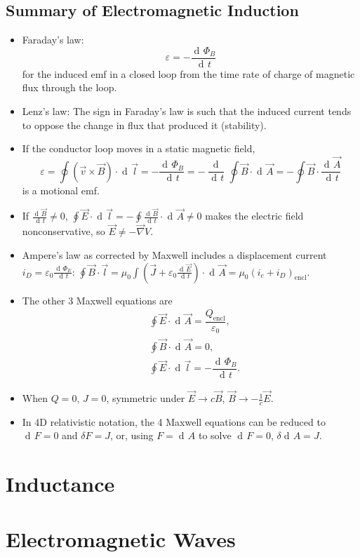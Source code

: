 \documentclass[11pt, letterpaper, titlepage]{report}
\DeclareMathOperator{\di}{d\!} %
\newcommand{\bracks}[1]{ \left( #1 \right) } %
\newcommand{\Bv}{ \vec{B} }
\newcommand{\Ev}{ \vec{E} }
\begin{document}
\section{Summary of Electromagnetic Induction}
\begin{itemize}
	\item Faraday's law:
	\begin{equation}
	\varepsilon = -\frac{\di \Phi_B}{\di t} 
	\end{equation}
	for the induced emf in a closed loop from the time rate of charge of magnetic flux through the loop.
	
	\item Lenz's law: The sign in Faraday's law is such that the induced current tends to oppose the change in flux that produced it (stability).
	
	\item If the conductor loop moves in a static magnetic field,
	\begin{equation}
	\varepsilon = \oint (\vec{v} \times \Bv) \cdot \di \vec{l} = -\dfrac{\di \Phi_B}{\di t} = -\dfrac{\di}{\di t} \oint \Bv\cdot\di\vec{A} = -\oint\Bv\cdot\dfrac{\di \vec{A}}{\di t} 
	\end{equation}
	is a motional emf.
	
	\item If $\frac{\di \Bv}{\di t} \neq 0$, $\oint \Ev \cdot \di \vec{l} = -\oint\frac{\di \Bv}{\di t} \cdot \di \vec{A} \neq 0$ makes the electric field nonconservative, so $\Ev \neq -\vec{\nabla} V$.
	
	\item Ampere's law as corrected by Maxwell includes a displacement current $i_D = \varepsilon_0 \frac{\di \Phi_E}{\di t}$: $\oint \Bv \cdot \vec{l} = \mu_0 \int \bracks{\vec{J} + \varepsilon_0 \frac{\di \Ev}{\di t}} \cdot \di \vec{A} = \mu_0(i_c + i_D)_\text{encl}$.
	
	\item The other 3 Maxwell equations are
	\begin{align}
	&\oint \Ev \cdot \di \vec{A} = \dfrac{Q_\text{encl}}{\varepsilon_0}, \\
	&\oint \Bv \cdot \di \vec{A} = 0, \\
	&\oint \Ev \cdot \di \vec{l} = -\dfrac{\di \Phi_B}{\di t}.
	\end{align}
	
	\item When $Q=0$, $J=0$, symmetric under $\Ev \to c\Bv$, $\Bv \to -\frac{1}{c}\Ev$.
	
	\item In 4D relativistic notation, the 4 Maxwell equations can be reduced to $\di F = 0$ and $\delta F = J$, or, using $F = \di A$ to solve $\di F = 0$, $\delta \di A = J$.

\end{itemize}

\chapter{Inductance}
\chapter{Electromagnetic Waves}
\end{document}
